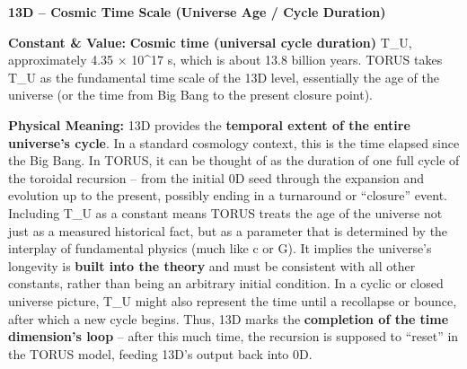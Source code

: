 \textbf{13D -- Cosmic Time Scale (Universe Age / Cycle Duration)}

\textbf{Constant \& Value:} \textbf{Cosmic time (universal cycle
duration)} T\_U, approximately 4.35 × 10\^{}17 s​, which is about 13.8
billion years. TORUS takes T\_U as the fundamental time scale of the 13D
level, essentially the age of the universe (or the time from Big Bang to
the present closure point).

\textbf{Physical Meaning:} 13D provides the \textbf{temporal extent of
the entire universe's cycle}. In a standard cosmology context, this is
the time elapsed since the Big Bang. In TORUS, it can be thought of as
the duration of one full cycle of the toroidal recursion -- from the
initial 0D seed through the expansion and evolution up to the present,
possibly ending in a turnaround or ``closure'' event​. Including T\_U as
a constant means TORUS treats the age of the universe not just as a
measured historical fact, but as a parameter that is determined by the
interplay of fundamental physics (much like c or G). It implies the
universe's longevity is \textbf{built into the theory} and must be
consistent with all other constants, rather than being an arbitrary
initial condition​. In a cyclic or closed universe picture, T\_U might
also represent the time until a recollapse or bounce, after which a new
cycle begins. Thus, 13D marks the \textbf{completion of the time
dimension's loop} -- after this much time, the recursion is supposed to
``reset'' in the TORUS model, feeding 13D's output back into 0D.

